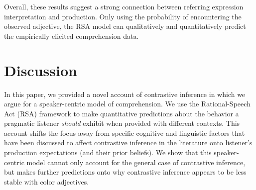 \documentclass[10pt,letterpaper]{article}
\begin{document}
Overall, these results suggest a strong connection between referring expression interpretation and production. Only using the probability of encountering the observed adjective, the RSA model can qualitatively and quantitatively predict the empirically elicited comprehension data. 


\section{Discussion}

In this paper, we provided a novel account of contrastive inference in which we argue for a speaker-centric model of comprehension. We use the Rational-Speech Act (RSA) framework to make quantitative predictions about the behavior a pragmatic listener \textit{should} exhibit when provided with different contexts. This account shifts the focus away from specific cognitive and linguistic factors that have been discussed to affect contrastive inference in the literature onto listener's production expectations (and their prior beliefs). We show that this speaker-centric model cannot only account for the general case of contrastive inference, but makes further predictions onto why contrastive inference appears to be less stable with color adjectives. 
\end{document}
